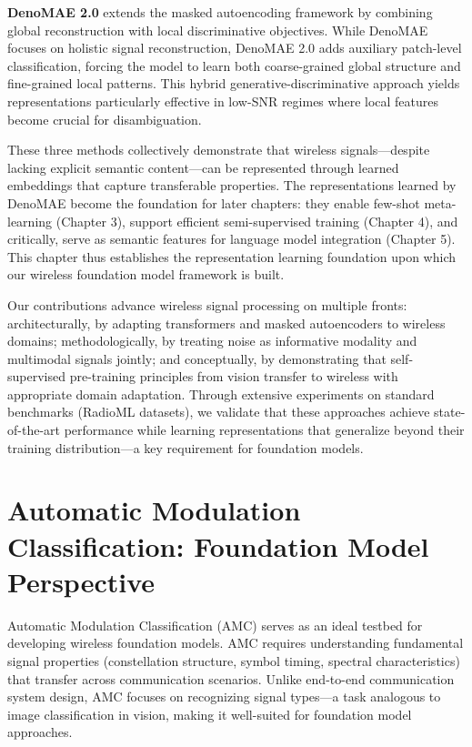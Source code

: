 \textbf{DenoMAE 2.0} extends the masked autoencoding framework by combining global reconstruction with local discriminative objectives. While DenoMAE focuses on holistic signal reconstruction, DenoMAE 2.0 adds auxiliary patch-level classification, forcing the model to learn both coarse-grained global structure and fine-grained local patterns. This hybrid generative-discriminative approach yields representations particularly effective in low-SNR regimes where local features become crucial for disambiguation.

These three methods collectively demonstrate that wireless signals—despite lacking explicit semantic content—can be represented through learned embeddings that capture transferable properties. The representations learned by DenoMAE become the foundation for later chapters: they enable few-shot meta-learning (Chapter 3), support efficient semi-supervised training (Chapter 4), and critically, serve as semantic features for language model integration (Chapter 5). This chapter thus establishes the representation learning foundation upon which our wireless foundation model framework is built.

Our contributions advance wireless signal processing on multiple fronts: architecturally, by adapting transformers and masked autoencoders to wireless domains; methodologically, by treating noise as informative modality and multimodal signals jointly; and conceptually, by demonstrating that self-supervised pre-training principles from vision transfer to wireless with appropriate domain adaptation. Through extensive experiments on standard benchmarks (RadioML datasets), we validate that these approaches achieve state-of-the-art performance while learning representations that generalize beyond their training distribution—a key requirement for foundation models.

\section{Automatic Modulation Classification: Foundation Model Perspective}

Automatic Modulation Classification (AMC) serves as an ideal testbed for developing wireless foundation models. AMC requires understanding fundamental signal properties (constellation structure, symbol timing, spectral characteristics) that transfer across communication scenarios. Unlike end-to-end communication system design, AMC focuses on recognizing signal types—a task analogous to image classification in vision, making it well-suited for foundation model approaches.


